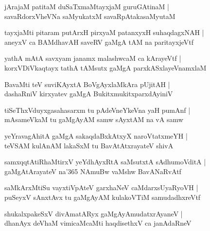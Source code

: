 \documentclass[twoside,12pt,openright]{book}
\newcounter{shloka}[chapter]
\begin{document}
\begin{shloka}%
jArajaM patitaM duSaTxmaMtayxjaM guruGAtinaM |\\
savaRdorxVheVNa saMyukatxM savaRpAtakasaMyutaM 
\end{shloka}

\begin{shloka}%
tayxjaMti pitaram putArxH pirxyaM patanxyxH suhaqdagxNAH |\\
aneyxV ca BAMdhavAH saveRV gaMgA tAM na paritayxjeVtf
\end{shloka}

\begin{shloka}%
yathA mAtA savxyam janamx malashwcaM ca kArayeVtf |\\
korxVDiVkaqtayx tathA tAMsutx gaMgA parxkASxlayeVnamxlaM 
\end{shloka}

\begin{shloka}%
BavaMti teV suviKAyxtA BoVgAyxlaMkAra pUjitAH |\\
dashaRniV kirxyatev gaMgA BukitxmukitxparxdAyiniV 
\end{shloka}

\begin{shloka}%
tiSeThxVduyxgasahasarxm tu pAdeVneYkeVna yaH pumAnf |\\
mAsameVkaM tu gaMgAyAM samw sAyxtAM na vA samw
\end{shloka}

\begin{shloka}%
yeYravagAhitA gaMgA sakaqdaBxkAtxyX naroVtatxmeYH |\\
teVSAM kulAnAM lakaSxM tu BavAtAtxrayateV shivA 
\end{shloka}

\begin{shloka}%
samxqqtAtiRhaMtirxV yeYdhAyxRtA saMsutxtA sAdhumoVditA |\\
gaMgAtArayateV na\char'365 NAmuBw vaMshw BavANaRvAtf
\end{shloka}

\begin{shloka}%
saMkArxMtiSu vayxtiVpAteV garxhaNeV caMdarxsUyaRyoVH |\\
puSeyxV sAnxtAvx tu gaMgAyAM kulakoVTiM samudadhxreVtf
\end{shloka}

\begin{shloka}%
shukalxpakeSxV divAmatARyx gaMgAyAmudatxrAyaneV |\\
dhanAyx deVhaM vimicaMcaMti haqdisethxV ca janAdaRneV 
\end{shloka}
\end{document}
